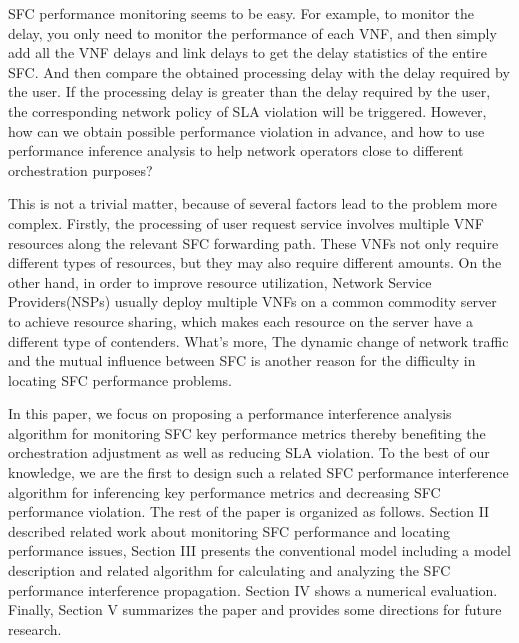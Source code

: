 \documentclass{ieeeaccess}
\begin{document}
SFC performance monitoring seems to be easy. For example, to monitor the delay, you only need to monitor the performance of each VNF, and then simply add all the VNF delays and link delays to get the delay statistics of the entire SFC. And then compare the obtained processing delay with the delay required by the user. If the processing delay is greater than the delay required by the user, the corresponding network policy of SLA violation will be triggered. However, how can we obtain possible performance violation in advance, and how to use performance inference analysis to help network operators close to different orchestration purposes?

This is not a trivial matter, because of several factors lead to the problem more complex. Firstly, the processing of user request service involves multiple VNF resources along the relevant SFC forwarding path. These VNFs not only require different types of resources, but they may also require different amounts. On the other hand, in order to improve resource utilization, Network Service Providers(NSPs) usually deploy multiple VNFs on a common commodity server to achieve resource sharing, which makes each resource on the server have a different type of contenders. What’s more, The dynamic change of network traffic and the mutual influence between SFC is another reason for the difficulty in locating SFC performance problems.

In this paper, we focus on proposing a performance interference analysis algorithm for monitoring SFC key performance metrics thereby benefiting the orchestration adjustment as well as reducing SLA violation. To the best of our knowledge, we are the first to design such a related SFC performance interference algorithm for inferencing key performance metrics and decreasing SFC performance violation.
The rest of the paper is organized as follows. Section II described related work about monitoring SFC performance and locating performance issues, Section III presents the conventional model including a model description and related algorithm for calculating and analyzing the SFC performance interference propagation. Section IV shows a numerical evaluation. Finally, Section V summarizes the paper and provides some directions for future research.
\end{document}
